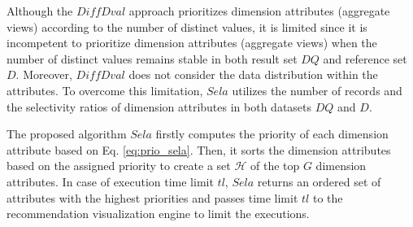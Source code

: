 Although the $DiffDval$ approach prioritizes dimension attributes (aggregate views) according to the number of distinct values, it is limited since it is incompetent to prioritize dimension attributes (aggregate views) when the number of distinct values remains stable in both result set $DQ$ and reference set $D$.
%
Moreover, $DiffDval$ does not consider the data distribution within the attributes. 
%
To overcome this limitation, $Sela$ utilizes the number of records and the selectivity ratios of dimension attributes in both datasets $DQ$ and $D$.

%

%
The proposed algorithm $Sela$ firstly computes the priority of each dimension attribute based on Eq. \ref{eq:prio_sela}.
%
Then, it sorts the dimension attributes based on the assigned priority to create a set $\mathcal{H}$ of 
the top $G$ dimension attributes.
%
In case of execution time limit $tl$, $Sela$ returns an ordered set of attributes with the highest priorities and passes time limit $tl$ to the recommendation visualization engine to limit the executions. 
%

